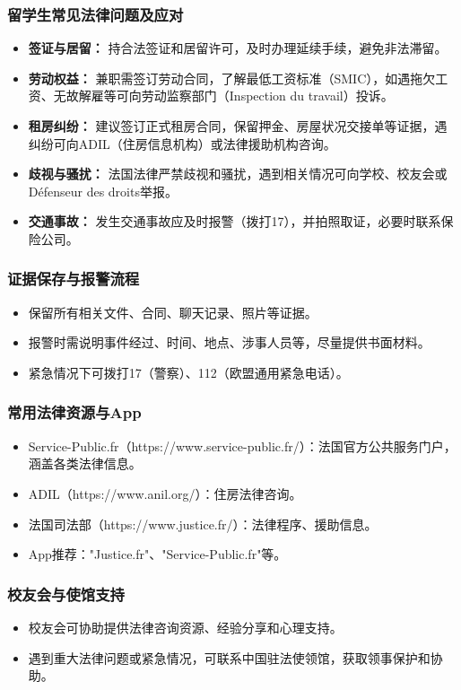 \subsubsection{留学生常见法律问题及应对}
\begin{itemize}
    \item \textbf{签证与居留：} 持合法签证和居留许可，及时办理延续手续，避免非法滞留。
    \item \textbf{劳动权益：} 兼职需签订劳动合同，了解最低工资标准（SMIC），如遇拖欠工资、无故解雇等可向劳动监察部门（Inspection du travail）投诉。
    \item \textbf{租房纠纷：} 建议签订正式租房合同，保留押金、房屋状况交接单等证据，遇纠纷可向ADIL（住房信息机构）或法律援助机构咨询。
    \item \textbf{歧视与骚扰：} 法国法律严禁歧视和骚扰，遇到相关情况可向学校、校友会或Défenseur des droits举报。
    \item \textbf{交通事故：} 发生交通事故应及时报警（拨打17），并拍照取证，必要时联系保险公司。
\end{itemize}

\subsubsection{证据保存与报警流程}
\begin{itemize}
    \item 保留所有相关文件、合同、聊天记录、照片等证据。
    \item 报警时需说明事件经过、时间、地点、涉事人员等，尽量提供书面材料。
    \item 紧急情况下可拨打17（警察）、112（欧盟通用紧急电话）。
\end{itemize}

\subsubsection{常用法律资源与App}
\begin{itemize}
    \item Service-Public.fr（https://www.service-public.fr/）：法国官方公共服务门户，涵盖各类法律信息。
    \item ADIL（https://www.anil.org/）：住房法律咨询。
    \item 法国司法部（https://www.justice.fr/）：法律程序、援助信息。
    \item App推荐："Justice.fr"、"Service-Public.fr"等。
\end{itemize}

\subsubsection{校友会与使馆支持}
\begin{itemize}
    \item 校友会可协助提供法律咨询资源、经验分享和心理支持。
    \item 遇到重大法律问题或紧急情况，可联系中国驻法使领馆，获取领事保护和协助。
\end{itemize}

